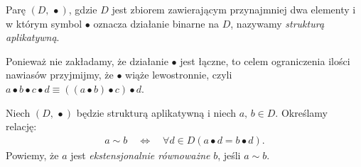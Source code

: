 \begin{definicja}
Parę \((D,\, \bullet)\), gdzie \(D\) jest zbiorem zawierającym przynajmniej dwa elementy i w którym symbol \(\bullet\) oznacza działanie binarne na \(D\), nazywamy \emph{strukturą aplikatywną}.
\end{definicja}
\begin{konwencja*}
  Ponieważ nie zakładamy, że działanie \(\bullet\) jest łączne, to celem ograniczenia ilości nawiasów przyjmijmy, że \(\bullet\) wiąże lewostronnie, czyli \(a\bullet b\bullet c\bullet d \equiv \left(\left(a\bullet b\right)\bullet c\right)\bullet d\).
\begin{definicja}%
Niech \((D,\,\bullet)\) będzie strukturą aplikatywną i niech \(a,\,b\in D\). Określamy relację: 
\begin{align*}
a \sim b \quad \Leftrightarrow\quad \forall d \in D \left(a \bullet d = b \bullet d\right).
\end{align*}
Powiemy, że \(a\) jest \emph{ekstensjonalnie równoważne} \(b\), jeśli \(a\sim b\).
\end{definicja}

\end{konwencja*}

